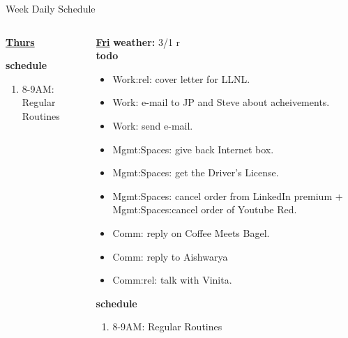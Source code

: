 \begin{columns}
\begin{column}{0.6\linewidth}
\begin{block}{Week Daily Schedule}
\begin{columns}
\begin{column}{0.14\textwidth}{\small \underline{\bf Thurs}}
\begin{itemize}
            \end{itemize} 
                {\tiny {\bf schedule}} \\
                \begin{enumerate} 
                  \tiny \item \tiny 8-9AM: Regular Routines 
                \end{enumerate}
          \end{column} 
          
          \begin{column}{0.14\textwidth}{\small \underline{\bf Fri}}
            {\tiny \bf weather: } {\tiny 3/1 r} \\ 
            {\tiny \bf todo} \\ 
            \begin{itemize} 
            \item \tiny Work:rel: cover letter for LLNL.
            \item \tiny Work: e-mail to JP and Steve about acheivements.
            \item \tiny Work: send e-mail. 
            \item \tiny Mgmt:Spaces: give back Internet box. 
            \item \tiny Mgmt:Spaces: get the Driver's License.  
      \item \tiny Mgmt:Spaces: cancel order from LinkedIn premium +
        Mgmt:Spaces:cancel order of Youtube Red. 
            \item \tiny Comm: reply on Coffee Meets Bagel.
            \item \tiny Comm: reply to Aishwarya
            \item \tiny Comm:rel: talk with Vinita. 
                
            \end{itemize} 
                {\tiny \bf schedule} \\
                \begin{enumerate} 
                  \tiny \item \tiny 8-9AM: Regular Routines 
                \end{enumerate}
          \end{column}


\end{columns}
\end{block}
\end{column}
\end{columns}
